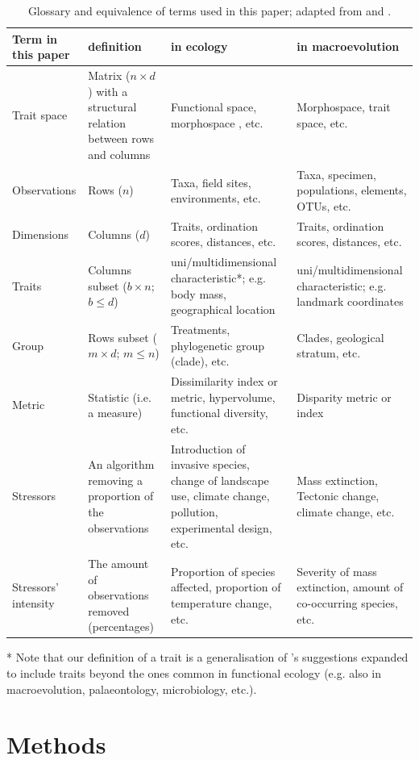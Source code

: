 \documentclass[12pt,letterpaper]{article}
\begin{document}
\begin{table}[htbp]
\caption{Glossary and equivalence of terms used in this paper; adapted from \cite{guillerme2018disprity} and \cite{mammola2021concepts}.}
\centering
\begin{tabular}{p{2.5cm}p{4cm}p{5cm}p{5cm}}
Term in this paper & definition & in ecology & in macroevolution \\
\hline
Trait space & Matrix ($n \times d$) with a structural relation between rows and columns & Functional space, morphospace , etc. & Morphospace, trait space, etc.  \\
\hline
Observations & Rows ($n$) & Taxa, field sites, environments, etc. & Taxa, specimen, populations, elements, OTUs, etc. \\
\hline
Dimensions & Columns ($d$) & Traits, ordination scores, distances, etc. & Traits, ordination scores, distances, etc. \\
\hline
Traits & Columns subset ($b \times n$; $b \leq d$) & uni/multidimensional characteristic*; e.g. body mass, geographical location & uni/multidimensional characteristic; e.g. landmark coordinates \\
\hline
Group & Rows subset ($m \times d$; $m \leq n$) & Treatments, phylogenetic group (clade), etc. & Clades, geological stratum, etc. \\
\hline
Metric & Statistic (i.e. a measure) & Dissimilarity index or metric, hypervolume, functional diversity, etc. & Disparity metric or index \\
\hline
Stressors & An algorithm removing a proportion of the observations & Introduction of invasive species, change of landscape use, climate change, pollution, experimental design, etc. & Mass extinction, Tectonic change, climate change, etc. \\
\hline
Stressors' intensity & The amount of observations removed (percentages) & Proportion of species affected, proportion of temperature change, etc. & Severity of mass extinction, amount of co-occurring species, etc. \\
\hline
\end{tabular}
\label{Tab:glossary}
* Note that our definition of a trait is a generalisation of \cite{violle2007let,mcgill2006rebuilding,dawson2021traits}'s suggestions expanded to include traits beyond the ones common in functional ecology (e.g. also in macroevolution, palaeontology, microbiology, etc.).
\end{table}


\section{Methods}
\end{document}
